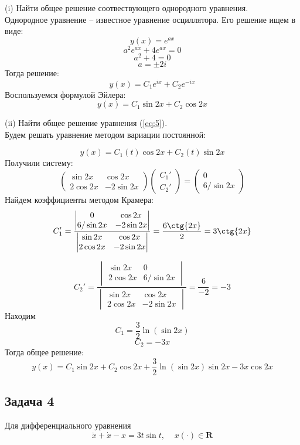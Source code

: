 \documentclass[a4paper, 12pt]{article}
\begin{document}
(i) Найти общее решение соотвествующего однородного уравнения.\\
Однородное уравнение -- известное уравнение осциллятора. Его решение ищем в виде:
\[y(x) = e^{ax}\]
\[a^2e^{ax}+4e^{ax}=0\]
\[a^2+4=0\]
\[a = \pm 2i\]
Тогда решение:
\[y(x)=C_1e^{ix}+C_2e^{-ix}\]
Воспользуемся формулой Эйлера:
\[y(x)= C_1\sin{2x}+C_2\cos{2x}\]

(ii) Найти общее решение уравнения (\ref{eq:5}).\\
Будем решать уравнение методом вариации постоянной:

\[y(x)= C_1(t)\cos{2x}+C_2(t)\sin{2x}\]
Получили систему:
\[ \left(
\begin{array}{cc}
\sin{2x} & \cos{2x} \\
2\cos{2x} & -2\sin{2x}
\end{array}
\right) \left(
\begin{array}{c}
C_1' \\
C_2'
\end{array} 
\right)= \left(
\begin{array}{c}
0 \\
6/\sin{2x}
\end{array}
\right) \]
Найдем коэффициенты методом Крамера:
\[C_1' = \frac{\begin{vmatrix}
0 & \cos{2x} \\
6/\sin{2x} & -2\sin{2x}
\end{vmatrix}}{\begin{vmatrix}
\sin{2x} & \cos{2x} \\
2\cos{2x} & -2\sin{2x}
\end{vmatrix}}= \frac {6\ctg{2x}}{2} = 3\ctg{2x}\]

\[C_2' = \frac{\begin{vmatrix}
\sin{2x} & 0 \\
2\cos{2x} & 6/\sin{2x}
\end{vmatrix}}{\begin{vmatrix}
\sin{2x} & \cos{2x} \\
2\cos{2x} & -2\sin{2x}
\end{vmatrix}}= \frac {6}{-2} = - 3\]
Находим 
\[C_1 = \frac 3 2 \ln{(\sin{2x})}\]
\[C_2=-3x\]
Тогда общее решение:
\[y(x) = C_1\sin{2x}+C_2\cos{2x}+\frac {3} {2} \ln{(\sin{2x})}\sin{2x}-3x\cos{2x}\]


	\subsection* {Задача 4}

Для дифференциального уравнения
\begin{equation}
\ddot{x}+\dot{x}-x=3t\sin{t}, \;\;\;\; x(\cdot)\in \textbf{R}
\label{eq:6}
\end{equation}
\end{document}
